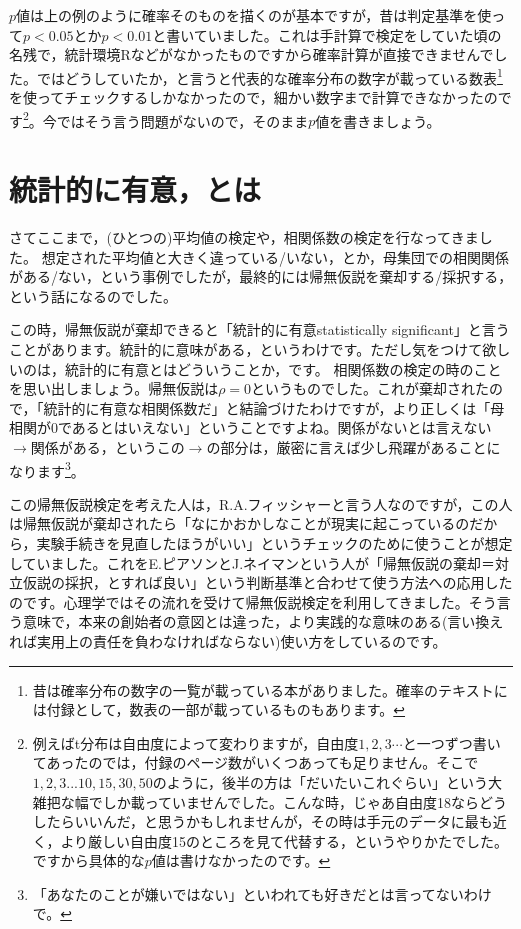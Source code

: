 \documentclass{ltjsarticle}
\begin{document}
$p$値は上の例のように確率そのものを描くのが基本ですが，昔は判定基準を使って$p<0.05$とか$p<0.01$と書いていました。これは手計算で検定をしていた頃の名残で，統計環境Rなどがなかったものですから確率計算が直接できませんでした。ではどうしていたか，と言うと代表的な確率分布の数字が載っている数表\footnote{昔は確率分布の数字の一覧が載っている本がありました。確率のテキストには付録として，数表の一部が載っているものもあります。}を使ってチェックするしかなかったので，細かい数字まで計算できなかったのです\footnote{例えばt分布は自由度によって変わりますが，自由度$1,2,3\cdots$と一つずつ書いてあったのでは，付録のページ数がいくつあっても足りません。そこで$1,2,3...10,15,30,50$のように，後半の方は「だいたいこれぐらい」という大雑把な幅でしか載っていませんでした。こんな時，じゃあ自由度18ならどうしたらいいんだ，と思うかもしれませんが，その時は手元のデータに最も近く，より厳しい自由度15のところを見て代替する，というやりかたでした。ですから具体的な$p$値は書けなかったのです。}。今ではそう言う問題がないので，そのまま$p$値を書きましょう。

\section{統計的に有意，とは}
\label{sec::18_04}
さてここまで，(ひとつの)平均値の検定や，相関係数の検定を行なってきました。
想定された平均値と大きく違っている/いない，とか，母集団での相関関係がある/ない，という事例でしたが，最終的には帰無仮説を棄却する/採択する，という話になるのでした。

この時，帰無仮説が棄却できると「統計的に有意statistically significant」と言うことがあります。統計的に意味がある，というわけです。ただし気をつけて欲しいのは，統計的に有意とはどういうことか，です。
相関係数の検定の時のことを思い出しましょう。帰無仮説は$\rho=0$というものでした。これが棄却されたので，「統計的に有意な相関係数だ」と結論づけたわけですが，より正しくは「母相関が0であるとはいえない」ということですよね。関係がないとは言えない$\to$関係がある，というこの$\to$の部分は，厳密に言えば少し飛躍があることになります\footnote{「あなたのことが嫌いではない」といわれても好きだとは言ってないわけで。}。

この帰無仮説検定を考えた人は，R.A.フィッシャーと言う人なのですが，この人は帰無仮説が棄却されたら「なにかおかしなことが現実に起こっているのだから，実験手続きを見直したほうがいい」というチェックのために使うことが想定していました。これをE.ピアソンとJ.ネイマンという人が「帰無仮説の棄却＝対立仮説の採択，とすれば良い」という判断基準と合わせて使う方法への応用したのです。心理学ではその流れを受けて帰無仮説検定を利用してきました。そう言う意味で，本来の創始者の意図とは違った，より実践的な意味のある(言い換えれば実用上の責任を負わなければならない)使い方をしているのです。
\end{document}
